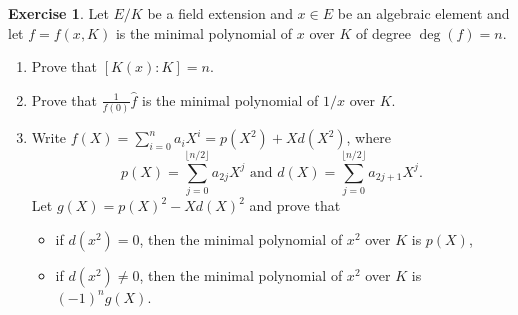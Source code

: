 \documentclass[a4paper,10pt,reqno]{amsart}
\theoremstyle{definition} %
\newtheorem{ex}{Exercise}[section]
\begin{document}
\begin{ex}
    Let $E/K$ be a field extension and $x\in E$ be an algebraic element and let $f=f(x,K)$ is the minimal polynomial of $x$ over $K$ of degree $\deg(f)=n$.
    \begin{enumerate}[label=(\roman*)]
    \item Prove that $[K(x):K]=n$.
    \item Prove that $\frac{1}{f(0)}\widehat{f}$ is the minimal polynomial of $1/x$ over $K$.
    \item Write $f(X)=\sum_{i=0}^na_iX^i=p(X^2)+Xd(X^2)$, where 
    \[
    p(X)=\sum_{j=0}^{\lfloor n/2\rfloor } a_{2j}X^{j}\text { and }
    d(X)=\sum_{j=0}^{\lfloor n/2\rfloor } a_{2j+1}X^j.
    \]
    Let $g(X)=p(X)^2-Xd(X)^2$ and prove that
    \begin{itemize}
        \item if $d(x^2)=0$, then the minimal polynomial of $x^2$ over $K$ is $p(X)$,
        \item if $d(x^2)\neq 0$, then the minimal polynomial of $x^2$ over $K$ is $(-1)^ng(X)$.
    \end{itemize}
    \noindent
    \end{enumerate}
\end{ex}
\end{document}
